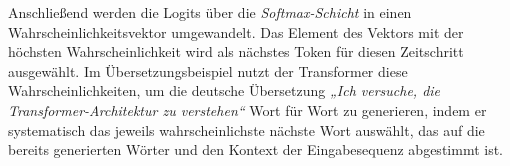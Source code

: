 Anschließend werden die Logits über die \emph{Softmax-Schicht} in einen Wahrscheinlichkeitsvektor umgewandelt. Das Element des Vektors mit der höchsten Wahrscheinlichkeit wird als nächstes Token für diesen Zeitschritt ausgewählt. Im Übersetzungsbeispiel nutzt der Transformer diese Wahrscheinlichkeiten, um die deutsche Übersetzung \emph{„Ich versuche, die Transformer-Architektur zu verstehen“} Wort für Wort zu generieren, indem er systematisch das jeweils wahrscheinlichste nächste Wort auswählt, das auf die bereits generierten Wörter und den Kontext der Eingabesequenz abgestimmt ist. \cite{Formal_Algorithms_for_Transformers_DeepMind}

